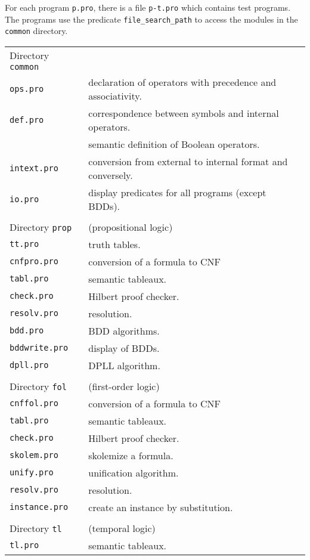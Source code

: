 \documentclass[11pt]{article}
\newcommand*{\p}[1]{\textup{\texttt{#1}}}
\begin{document}
For each program \p{p.pro}, there is a file \p{p-t.pro} which contains
test programs. The programs use the predicate \p{file\_search\_path} to
access the modules in the \p{common} directory.

\smallskip

\begin{tabular}{l@{\hspace{3em}}l}
Directory \p{common}&\\
\p{ops.pro}      & declaration of operators with precedence and
associativity.\\
\p{def.pro}      & correspondence between symbols and internal operators.\\
            & semantic definition of Boolean operators.\\
\p{intext.pro}   & conversion from external to internal format and conversely.\\
\p{io.pro}       & display predicates for all programs (except BDDs).\\
\\
Directory \p{prop} &  (propositional logic)\\
\p{tt.pro}       & truth tables.\\
\p{cnfpro.pro}   & conversion of a formula to CNF\\
\p{tabl.pro}     & semantic tableaux.\\
\p{check.pro}    & Hilbert proof checker.\\
\p{resolv.pro}   & resolution.\\
\p{bdd.pro}      & BDD algorithms.\\
\p{bddwrite.pro} & display of BDDs.\\
\p{dpll.pro}     & DPLL algorithm.\\
\\
Directory \p{fol}  & (first-order logic)\\
\p{cnffol.pro}   & conversion of a formula to CNF\\
\p{tabl.pro}     & semantic tableaux.\\
\p{check.pro}    & Hilbert proof checker.\\
\p{skolem.pro}   & skolemize a formula.\\
\p{unify.pro}    & unification algorithm.\\
\p{resolv.pro}   & resolution.\\
\p{instance.pro} & create an instance by substitution.\\
\\
Directory \p{tl}  &   (temporal logic)\\
\p{tl.pro}       & semantic tableaux.\\
\end{tabular}
\end{document}
